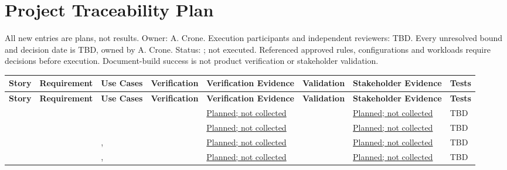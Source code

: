 \section{Project Traceability Plan}\label{Section:ProjectTraceabilityPlan}
All new entries are plans, not results. Owner: A. Crone. Execution participants
and independent reviewers: TBD. Every unresolved bound and decision date is
TBD, owned by A. Crone. Status: \StatusPending; not executed. Referenced
approved rules, configurations and workloads require decisions before execution.
Document-build success is not product verification or stakeholder validation.
\begin{landscape}\small

\begin{tabularx}{\linewidth}{L{1.7cm}L{2.3cm}L{2.5cm}L{1.8cm}YL{1.8cm}YL{1.4cm}}
\caption{Project Traceability Register\label{Table:ProjectTraceabilityRegister}}\\
\toprule\textbf{Story} & \textbf{Require\-ment} & \textbf{Use Cases} & \textbf{Verifi\-cation} & \textbf{Verification Evidence} & \textbf{Vali\-dation} & \textbf{Stakeholder Evidence} & \textbf{Tests}\\\midrule\endfirsthead
\toprule\textbf{Story} & \textbf{Require\-ment} & \textbf{Use Cases} & \textbf{Verifi\-cation} & \textbf{Verification Evidence} & \textbf{Vali\-dation} & \textbf{Stakeholder Evidence} & \textbf{Tests}\\\midrule\endhead\bottomrule\endlastfoot
{} &  &  &  & \hyperref[PlannedEvidence:VER-010]{Planned; not collected} &  & \hyperref[PlannedEvidence:VAL-004]{Planned; not collected} & TBD\\
 &  &  &  & \hyperref[PlannedEvidence:VER-011]{Planned; not collected} &  & \hyperref[PlannedEvidence:VAL-005]{Planned; not collected} & TBD\\
 &  & ,  &  & \hyperref[PlannedEvidence:VER-012]{Planned; not collected} &  & \hyperref[PlannedEvidence:VAL-006]{Planned; not collected} & TBD\\
 &  & ,  &  & \hyperref[PlannedEvidence:VER-013]{Planned; not collected} &  & \hyperref[PlannedEvidence:VAL-007]{Planned; not collected} & TBD\\

\end{tabularx}
\end{landscape}
